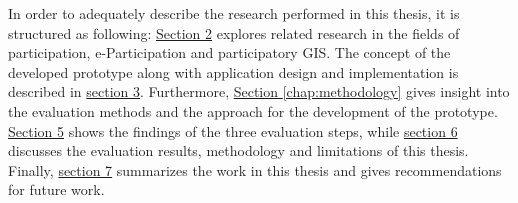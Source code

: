 In order to adequately describe the research performed in this thesis, it is structured as following: \hyperref[chap:related_work]{Section 2} explores related research in the fields of participation, e-Participation and participatory GIS. The concept of the developed prototype along with application design and implementation is described in \hyperref[chap:approach]{section 3}. Furthermore, \hyperref[chap:methodology]{Section \ref{chap:methodology}} gives insight into the evaluation methods and the approach for the development of the prototype. \hyperref[chap:methodology]{Section 5} shows the findings of the three evaluation steps, while \hyperref[chap:discussion]{section 6} discusses the evaluation results, methodology and limitations of this thesis. Finally, \hyperref[chap:conclusion]{section 7} summarizes the work in this thesis and gives recommendations for future work.
